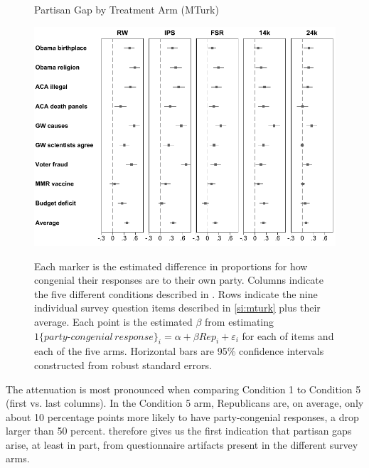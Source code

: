 \documentclass[12pt, letterpaper]{article}
\begin{document}
\begin{center}
	\begin{figure}[t]
		\centering
		\caption{Partisan Gap by Treatment Arm (MTurk)}
		\includegraphics[width=\textwidth]{../figs/partisan-gap-by-item-arm.pdf}
		\label{fig:partisangaps-mturk}
		\caption*{\footnotesize 
			Each marker is the estimated difference in proportions for how congenial their responses are to their own party.
			Columns indicate the five different conditions described in . Rows indicate the nine individual survey question items described in \cref{si:mturk} plus their average.
			Each point is the estimated $\beta$ from estimating $1\{party\text{-}congenial\, response\}_i = \alpha + \beta Rep_i + \varepsilon_i$ for each of items and each of the five arms.			
			Horizontal bars are 95\% confidence intervals constructed from robust standard errors.
		}
	\end{figure}
\end{center}

The attenuation is most pronounced when comparing Condition 1 to Condition 5 (first vs. last columns). In the Condition 5 arm, Republicans are, on average, only about 10 percentage points more likely to have party-congenial responses, a drop larger than 50 percent.  therefore gives us the first indication that partisan gaps arise, at least in part, from questionnaire artifacts present in the different survey arms.
\end{document}
